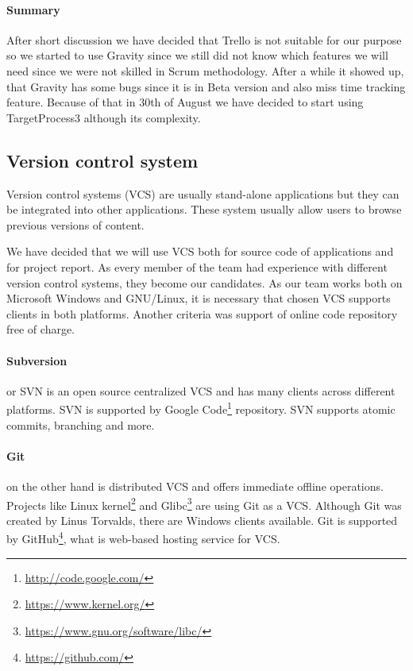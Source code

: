 \paragraph{Summary}
After short discussion we have decided that Trello is not suitable for our purpose so we started to use Gravity since 
we still did not know which features we will need since we were not skilled in Scrum methodology.
After a while it showed up, that Gravity has some bugs since it is in Beta version and also miss time tracking feature.
Because of that in 30th of August we have decided to start using TargetProcess3 although its complexity.


\subsection{Version control system}
Version control systems (VCS) are usually stand-alone applications but they can be integrated into other applications. These system usually allow users to browse previous versions of content.

We have decided that we will use VCS both for source code of applications and for project report. As every member of the team had experience with different version control systems, they become our candidates.
As our team works both on Microsoft Windows and GNU/Linux, it is necessary that chosen VCS supports clients in both platforms.
Another criteria was support of online code repository free of charge.

\paragraph{Subversion} or SVN is an open source centralized VCS and has many clients across different platforms. 
SVN is supported by Google Code\footnote{\url{http://code.google.com/}} repository.
SVN supports atomic commits, branching and more.

\paragraph{Git} on the other hand is distributed VCS and offers immediate offline operations.
Projects like Linux kernel\footnote{\url{https://www.kernel.org/}} and Glibc\footnote{\url{https://www.gnu.org/software/libc/}} are using Git as a VCS.
Although Git was created by Linus Torvalds, there are Windows clients available.
Git is supported by GitHub\footnote{\url{https://github.com/}}, what is web-based hosting service for VCS.

